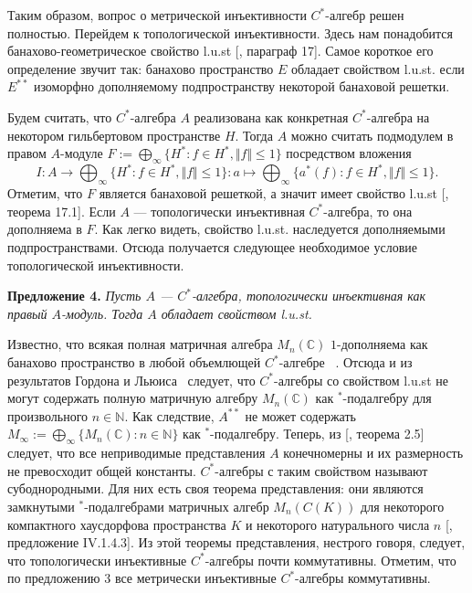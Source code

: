 \documentclass[12pt]{article}
\begin{document}
Таким образом, вопрос о метрической инъективности $C^*$-алгебр решен полностью.
Перейдем к топологической инъективности. Здесь нам понадобится
банахово-геометрическое свойство l.u.st [\cite{DiestAbsSumOps}, параграф 17].
Самое короткое его определение звучит так: банахово пространство $E$ обладает
свойством l.u.st. если $E^{**}$ изоморфно дополняемому подпространству некоторой
банаховой решетки. 

Будем считать, что $C^*$-алгебра $A$ реализована как конкретная $C^*$-алгебра на
некотором гильбертовом пространстве $H$. Тогда $A$ можно считать подмодулем в
правом $A$-модуле $F:=\bigoplus_\infty \{H^*:f\in H^*, \Vert f\Vert\leq 1 \}$
посредством вложения
$$
I
:A\to\bigoplus_\infty \{
    H^* :f\in H^*,\Vert f\Vert\leq 1 \}
:a\mapsto \bigoplus_\infty \{a^*(f):f\in H^*, \Vert f\Vert\leq 1 \}.
$$
Отметим, что $F$ является банаховой решеткой, а значит имеет свойство l.u.st
[\cite{DiestAbsSumOps}, теорема 17.1]. Если $A$ --- топологически инъективная
$C^*$-алгебра, то она дополняема в $F$. Как легко видеть, свойство l.u.st.
наследуется дополняемыми подпространствами. Отсюда получается следующее
необходимое условие топологической инъективности. 

\medskip
\textbf{Предложение 4.} \textit{Пусть $A$ --- $C^*$-алгебра, топологически
инъективная как правый $A$-модуль. Тогда $A$ обладает свойством l.u.st.}

\medskip
Известно, что всякая полная матричная алгебра $M_n(\mathbb{C})$ $1$-дополняема
как банахово пространство в любой объемлющей $C^*$-алгебре
~\cite{LauLoyWillisAmnblOfBanAndCStarAlgsOfLCG}. Отсюда и из результатов Гордона
и Льюиса~\cite{GorLewAbsSmOpAndLocUncondStrct} следует, что $C^*$-алгебры со
свойством l.u.st не могут содержать полную матричную алгебру $M_n(\mathbb{C})$
как ${}^*$-подалгебру для произвольного $n\in\mathbb{N}$. Как следствие,
$A^{**}$ не может содержать $M_\infty:=\bigoplus_\infty
\{M_n(\mathbb{C}):n\in\mathbb{N} \}$ как ${}^*$-подалгебру. Теперь, из
[\cite{LauLoyWillisAmnblOfBanAndCStarAlgsOfLCG}, теорема 2.5] следует, что все
неприводимые представления $A$ конечномерны и их размерность не превосходит
общей константы. $C^*$-алгебры с таким свойством называют субоднородными. Для
них есть своя теорема представления: они являются замкнутыми ${}^*$-подалгебрами
матричных алгебр $M_n(C(K))$ для некоторого компактного хаусдорфова пространства
$K$ и некоторого натурального числа $n$ [\cite{BlackadarOpAlg}, предложение
IV.1.4.3]. Из этой теоремы представления, нестрого говоря, следует, что
топологически инъективные $C^*$-алгебры почти коммутативны. Отметим, что по
предложению 3 все метрически инъективные $C^*$-алгебры коммутативны.
\end{document}
